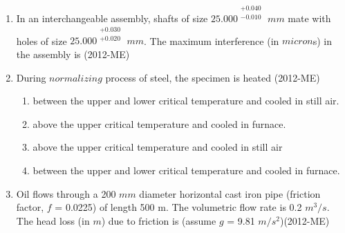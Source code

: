 \documentclass[journal,12pt,twocolumn]{IEEEtran}
\theoremstyle{remark}
\begin{document}
\begin{enumerate}
\item In an interchangeable assembly, shafts of size ${25.000}^{\begin{smallmatrix}+0.040 \\ -0.010 
\end{smallmatrix}}$ $mm$ mate with holes of size  $ 25.000^{ \begin{smallmatrix} +0.030 \\ +0.020 \end{smallmatrix} }
$ $mm$. The maximum interference (in $micron$s) in the assembly is \hfill{(2012-ME)} 
                 \begin{enumerate}   
                         \end{enumerate}





\item During $normalizing$ process of steel, the specimen is heated \hfill{(2012-ME)}
\begin{enumerate}
\item  between the upper and lower critical temperature and cooled in still air.
\item  above the upper critical temperature and cooled in furnace.
\item  above the upper critical temperature and cooled in still air
\item  between the upper and lower critical temperature and cooled in furnace.
\end{enumerate}

\item Oil flows through a 200 $mm$ diameter horizontal cast iron pipe (friction factor, $f$ = 0.0225) of length 500 m. The volumetric flow rate is 0.2 $m^3/s$. The head loss (in $m$) due to friction is (assume $g$ = 9.81 $m/s^2$)\hfill{(2012-ME)}
\begin{enumerate}
\end{enumerate}



\end{enumerate}
\end{document}
